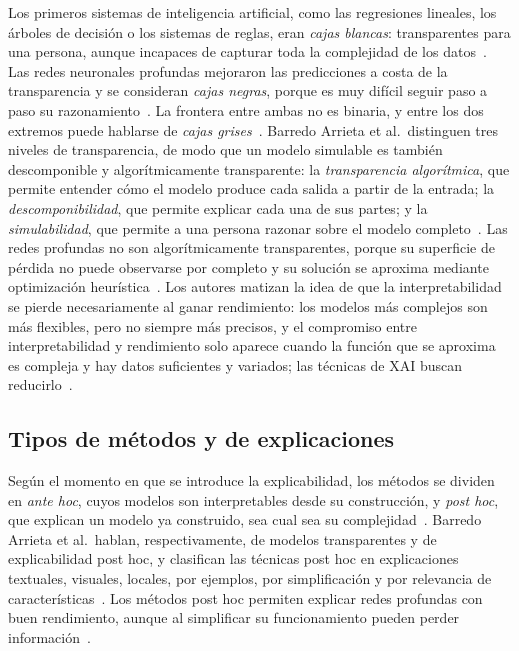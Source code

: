 Los primeros sistemas de inteligencia artificial, como las regresiones lineales,
los árboles de decisión o los sistemas de reglas, eran \emph{cajas blancas}:
transparentes para una persona, aunque incapaces de capturar toda la complejidad
de los datos~\cite{sevillano2025tesis}. Las redes neuronales profundas mejoraron
las predicciones a costa de la transparencia y se consideran \emph{cajas negras},
porque es muy difícil seguir paso a paso su razonamiento~\cite{sevillano2025tesis}.
La frontera entre ambas no es binaria, y entre los dos extremos puede hablarse de
\emph{cajas grises}~\cite{sevillano2025tesis}. Barredo Arrieta et al.\ distinguen
tres niveles de transparencia, de modo que un modelo simulable es también
descomponible y algorítmicamente transparente: la
\emph{transparencia algorítmica}, que permite entender cómo el modelo produce cada
salida a partir de la entrada; la \emph{descomponibilidad}, que permite explicar
cada una de sus partes; y la \emph{simulabilidad}, que permite a una persona
razonar sobre el modelo completo~\cite{barredo2020}. Las redes profundas no son algorítmicamente transparentes, porque su
superficie de pérdida no puede observarse por
completo y su solución se aproxima mediante optimización
heurística~\cite{barredo2020}. Los autores matizan la idea de que la
interpretabilidad se pierde necesariamente al ganar rendimiento: los modelos más
complejos son más flexibles, pero no siempre más precisos, y el compromiso entre
interpretabilidad y rendimiento solo aparece cuando la función que se aproxima es
compleja y hay datos suficientes y variados; las técnicas de XAI buscan
reducirlo~\cite{barredo2020}.

\subsection{Tipos de métodos y de explicaciones}\label{sec:ea-xai-tipos}

Según el momento en que se introduce la explicabilidad, los métodos se dividen en
\emph{ante hoc}, cuyos modelos son interpretables desde su construcción, y
\emph{post hoc}, que explican un modelo ya construido, sea cual sea su
complejidad~\cite{sevillano2025tesis}. Barredo Arrieta et al.\ hablan,
respectivamente, de modelos transparentes y de explicabilidad post hoc, y
clasifican las técnicas post hoc en explicaciones textuales, visuales, locales,
por ejemplos, por simplificación y por relevancia de
características~\cite{barredo2020}. Los métodos post hoc permiten explicar redes
profundas con buen rendimiento, aunque al simplificar su funcionamiento pueden
perder información~\cite{sevillano2025tesis}.

